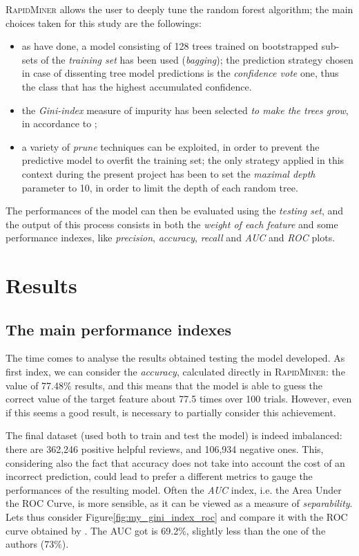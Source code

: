 \documentclass[a4paper]{article}
\begin{document}
	 		\textsc{RapidMiner} allows the user to deeply tune the random forest algorithm; the main choices taken for this study are the followings:
	 		\begin{itemize}
	 			\item as \citeauthor{article:muller} have done, a model consisting of 128 trees trained on bootstrapped sub-sets of the \emph{training set} has been used (\emph{bagging}); the prediction strategy chosen in case of dissenting tree model predictions is the \emph{confidence vote} one, thus the class that has the highest accumulated confidence.
	 			\item the \emph{Gini-index} measure of impurity has been selected \emph{to make the trees grow}, in accordance to \citeauthor{article:muller};
	 			\item a variety of \emph{prune} techniques can be exploited, in order to prevent the predictive model to overfit the training set; the only strategy applied in this context during the present project has been to set the \emph{maximal depth} parameter to 10, in order to limit the depth of each random tree.
	 		\end{itemize}
 		
			The performances of the model can then be evaluated using the \emph{testing set}, and the output of this process consists in both the \emph{weight of each feature} and some performance indexes, like \emph{precision}, \emph{accuracy}, \emph{recall} and \emph{AUC} and \emph{ROC} plots.		
	 		
		 			 	
	\section{Results}
		\subsection{The main performance indexes}
			The time comes to analyse the results obtained testing the model developed. As first index, we can consider the \emph{accuracy}, calculated directly in \textsc{RapidMiner}: the value of 77.48\% results, and this means that the model is able to guess the correct value of the target feature about 77.5 times over 100 trials.
			However, even if this seems a good result, is necessary to partially consider this achievement.
			
			The final dataset (used both to train and test the model) is indeed imbalanced: there are 362,246 positive helpful reviews, and 106,934 negative ones. This, considering also the fact that accuracy does not take into account the cost of an incorrect prediction, could lead to prefer a different metrics to gauge the performances of the resulting model. Often the \emph{AUC} index, i.e. the Area Under the ROC Curve, is more sensible, as it can be viewed as a measure of \emph{separability}. Lets thus consider Figure\autoref{fig:my_gini_index_roc} and compare it with the ROC curve obtained by \citeauthor{article:muller}. The AUC got is 69.2\%, slightly less than the one of the authors (73\%).
			
\end{document}
